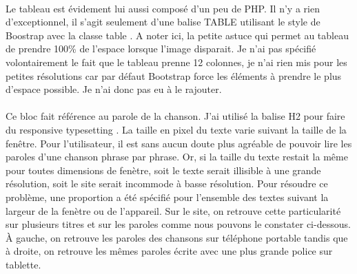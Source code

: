 \documentclass{article}
\begin{document}
\vspace{0.5cm}\\
Le tableau est \'evidement lui aussi compos\'e d'un peu de PHP. Il n'y a rien d'exceptionnel, il s'agit seulement d'une balise TABLE utilisant le style de Boostrap avec la classe \og table \fg{}. A noter ici, la petite astuce qui permet au tableau de prendre 100\% de l'espace lorsque l'image disparait. Je n'ai pas sp\'ecifi\'e volontairement le fait que le tableau prenne 12 colonnes, je n'ai rien mis pour les petites r\'esolutions car par d\'efaut Bootstrap force les \'el\'ements \`a prendre le plus d'espace possible. Je n'ai donc pas eu \`a le rajouter. 
\vspace{0.5cm}\\
\vspace{0.5cm}\\
Ce bloc fait r\'ef\'erence au parole de la chanson. J'ai utilis\'e la balise H2 pour faire du \og responsive typesetting \fg{}. La taille en pixel du texte varie suivant la taille de la fen\^etre. Pour l'utilisateur, il est sans aucun doute plus agr\'eable de pouvoir lire les paroles d'une chanson phrase par phrase. Or, si la taille du texte restait la m\^eme pour toutes dimensions de fen\`etre, soit le texte serait illisible \`a une grande r\'esolution, soit le site serait incommode \`a basse r\'esolution. Pour r\'esoudre ce probl\`eme, une proportion a \'et\'e sp\'ecifi\'e pour l'ensemble des textes suivant la largeur de la fen\`etre ou de l'appareil. Sur le site, on retrouve cette particularit\'e sur plusieurs titres et sur les paroles comme nous pouvons le constater ci-dessous. \`A gauche, on retrouve les paroles des chansons sur t\'el\'ephone portable tandis que \`a droite, on retrouve les m\^emes paroles \'ecrite avec une plus grande police sur tablette.
\end{document}
